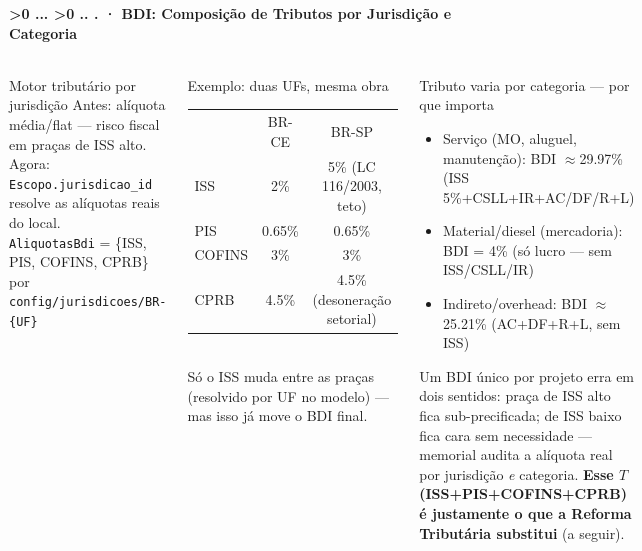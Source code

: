 \documentclass[aspectratio=169,10pt]{beamer}
\newcounter{mlc3}[subsection]
\newcounter{mlc4}[mlc3]
\newcommand{\pathnum}{%
  \ifnum\value{mlc4}>0
    \thesection.\thesubsection.\arabic{mlc3}.\arabic{mlc4}%
  \else\ifnum\value{mlc3}>0
    \thesection.\thesubsection.\arabic{mlc3}%
  \else
    \thesection.\thesubsection%
  \fi\fi
}
\newcommand{\lvlB}{\stepcounter{mlc4}}   %
\newcommand{\mtitle}[1]{%
  \frametitle{\insertsection}%
  \framesubtitle{\pathnum\;·\; #1}}
\begin{document}
\lvlB
\begin{frame}
  \mtitle{BDI: Composição de Tributos por Jurisdição e Categoria}
  \begin{columns}[T]
    \begin{block}{Motor tributário por jurisdição}
      \scriptsize Antes: alíquota média/flat --- risco fiscal em
      praças de ISS alto. Agora: \texttt{Escopo.jurisdicao\_id}
      resolve as alíquotas reais do local.\\[4pt]
      \texttt{AliquotasBdi} = \{ISS, PIS, COFINS, CPRB\} por
      \texttt{config/jurisdicoes/BR-\{UF\}}
    \end{block}
    \vspace{4pt}
    \begin{block}{Exemplo: duas UFs, mesma obra}
      \scriptsize
      \begin{tabular}{@{}lcc@{}}
        & BR-CE & BR-SP \\
        ISS     & 2\%    & 5\% (LC 116/2003, teto) \\
        PIS     & 0.65\% & 0.65\% \\
        COFINS  & 3\%    & 3\% \\
        CPRB    & 4.5\%  & 4.5\% (desoneração setorial) \\
      \end{tabular}\\[4pt]
      Só o ISS muda entre as praças (resolvido por UF no modelo) --- mas
      isso já move o BDI final.
    \end{block}
    \begin{exampleblock}{\small Tributo varia por categoria --- por que importa}
      \begin{itemize}\scriptsize
        \item \textcolor{mlorange}{Serviço} (MO, aluguel, manutenção):
          BDI $\approx$29.97\% (ISS 5\%+CSLL+IR+AC/DF/R+L)
        \item \textcolor{mlgreen}{Material/diesel} (mercadoria): BDI
          = 4\% (só lucro --- sem ISS/CSLL/IR)
        \item \textcolor{mlblue}{Indireto/overhead}: BDI
          $\approx$25.21\% (AC+DF+R+L, sem ISS)
      \end{itemize}
      \scriptsize Um BDI único por projeto erra em dois sentidos:
      praça de ISS alto fica sub-precificada; de ISS baixo fica cara
      sem necessidade --- memorial audita a alíquota real por
      jurisdição \emph{e} categoria. \textbf{Esse $T$ (ISS+PIS+COFINS+CPRB)
      é justamente o que a Reforma Tributária substitui} (a seguir).
    \end{exampleblock}
  \end{columns}
\end{frame}
\end{document}
